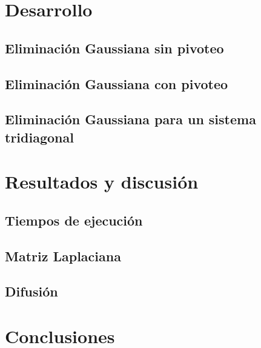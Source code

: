 \documentclass[10pt,a4paper]{article}
\begin{document}
\section{Desarrollo} \label{sec:Desarrollo}

\subsection{Eliminación Gaussiana sin pivoteo} \label{desarrollo_gauss_sin_pivoteo}


\subsection{Eliminación Gaussiana con pivoteo} \label{desarrollo_gauss_con_pivoteo}


\subsection{Eliminación Gaussiana para un sistema tridiagonal} \label{desarrollo_gauss_tridiagonal}


\section{Resultados y discusión} \label{sec:Resultados}

\subsection{Tiempos de ejecución} \label{resultados_tiempos_de_ejecucion}


\subsection{Matriz Laplaciana} \label{resultados_matriz_laplaciana}


\subsection{Difusión} \label{resultados_difusion}

\section{Conclusiones} \label{sec:Conclusiones}




\end{document}
